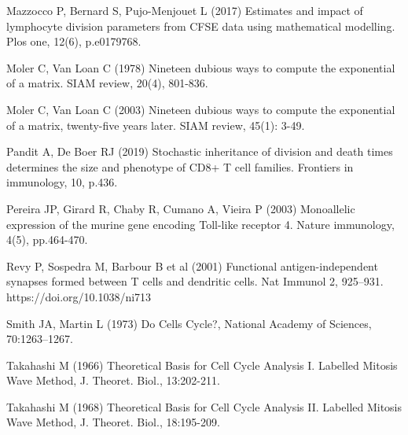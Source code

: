 \documentclass[10pt]{article}
\numberwithin{equation}{section}
\begin{document}
\begin{thebibliography}{}
Mazzocco P, Bernard S, Pujo-Menjouet L (2017) Estimates and impact of lymphocyte division parameters from CFSE data using mathematical modelling. Plos one, 12(6), p.e0179768.

Moler C, Van Loan C (1978) Nineteen dubious ways to compute the exponential of a matrix. SIAM review, 20(4), 801-836.

Moler C, Van Loan C (2003)
Nineteen dubious ways to compute the exponential of a matrix, twenty-five years later. SIAM review, 45(1): 3-49.

Pandit A, De Boer RJ (2019) Stochastic inheritance of division and death times determines the size and phenotype of CD8+ T cell families. Frontiers in immunology, 10, p.436.

Pereira JP, Girard R, Chaby R, Cumano A, Vieira P (2003) Monoallelic expression of the murine gene encoding Toll-like receptor 4. Nature immunology, 4(5), pp.464-470.



Revy P, Sospedra M, Barbour B et al (2001) Functional antigen-independent synapses formed between T cells and dendritic cells. Nat Immunol 2, 925–931. https://doi.org/10.1038/ni713

Smith JA, Martin L (1973) Do Cells Cycle?, National Academy of Sciences, 70:1263--1267.


Takahashi M (1966) Theoretical Basis for Cell Cycle Analysis I. Labelled Mitosis Wave Method, J. Theoret. Biol., 13:202-211.

Takahashi M (1968) Theoretical Basis for Cell Cycle Analysis II. Labelled Mitosis Wave Method, J. Theoret. Biol., 18:195-209.



\end{thebibliography}
\end{document}
